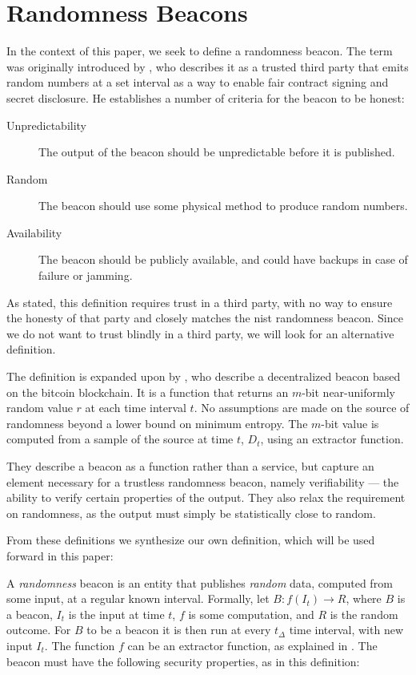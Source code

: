 \section{Randomness Beacons}\label{sec:beacons}

In the context of this paper, we seek to define a randomness beacon.
The term was originally introduced by \citet{rabin1983transaction}, who describes it as a trusted third party that emits random numbers at a set interval as a way to enable fair contract signing and secret disclosure.
He establishes a number of criteria for the beacon to be honest:

\begin{description}
    \item[Unpredictability] The output of the beacon should be unpredictable before it is published.
    \item[Random] The beacon should use some physical method to produce random numbers.
    \item[Availability] The beacon should be publicly available, and could have backups in case of failure or jamming.
\end{description}

As stated, this definition requires trust in a third party, with no way to ensure the honesty of that party and closely matches the \gls{nist} randomness beacon.
Since we do not want to trust blindly in a third party, we will look for an alternative definition.

The definition is expanded upon by \citet{bonneau2015bitcoin}, who describe a decentralized beacon based on the bitcoin blockchain.
It is a function that returns an $m$-bit near-uniformly random value $r$ at each time interval $t$.
No assumptions are made on the source of randomness beyond a lower bound on minimum entropy.
The $m$-bit value is computed from a sample of the source at time $t$, $D_t$, using an extractor function.

They describe a beacon as a function rather than a service, but capture an element necessary for a trustless randomness beacon, namely verifiability --- the ability to verify certain properties of the output.
They also relax the requirement on randomness, as the output must simply be statistically close to random.

From these definitions we synthesize our own definition, which will be used forward in this paper:

A \emph{randomness} beacon is an entity that publishes \emph{random} data, computed from some input, at a regular known interval.
Formally, let $B: f(I_t) \rightarrow R$, where $B$ is a beacon, $I_t$ is the input at time $t$, $f$ is some computation, and $R$ is the random outcome.
For $B$ to be a beacon it is then run at every $t_\Delta$ time interval, with new input $I_t$.
The function $f$ can be an extractor function, as explained in .
The beacon must have the following security properties, as in this definition:

